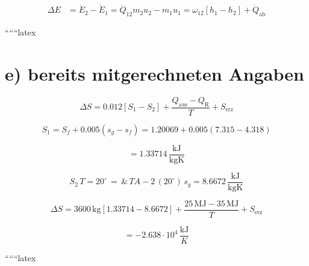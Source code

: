 \begin{align*}
\Delta E &= \dot{E}_2 - \dot{E}_1 = \dot{Q}_{12} m_2 u_2 - m_1 u_1 = \omega_{12} \left[ h_1 - h_2 \right] + \dot{Q}_{\text{ab}}
\end{align*}

``````latex

\section*{e) bereits mitgerechneten Angaben}

\[
\Delta S = 0.012 \left[ S_1 - S_2 \right] + \frac{Q_{\text{aus}} - Q_{\text{R}}}{T} + S_{\text{erz}}
\]

\[
S_1 = S_f + 0.005 \left( s_g - s_f \right) = 1.20069 + 0.005 \left( 7.315 - 4.318 \right)
\]

\[
= 1.33714 \, \frac{\text{kJ}}{\text{kgK}}
\]

\[
S_2 \, T = 20^\circ \, = \, \& \, TA - 2 \, (20^\circ) \, s_g = 8.6672 \, \frac{\text{kJ}}{\text{kgK}}
\]

\[
\Delta S = 3600 \, \text{kg} \left[ 1.33714 - 8.6672 \right] + \frac{25 \, \text{MJ} - 35 \, \text{MJ}}{T} + S_{\text{erz}}
\]

\[
= -2.638 \cdot 10^4 \, \frac{\text{kJ}}{K}
\]

``````latex


